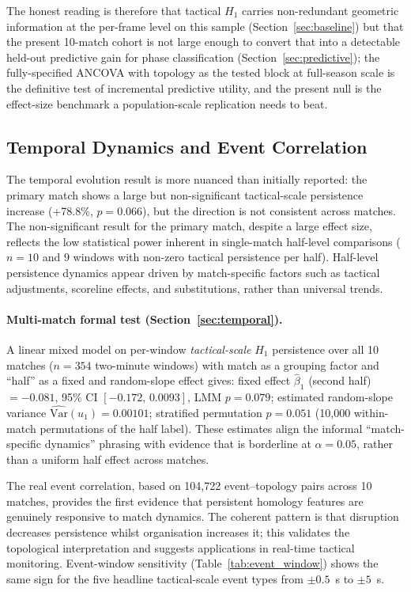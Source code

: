 The honest reading is therefore that tactical \(H_1\) carries non-redundant geometric information at the per-frame level on this sample (Section~\ref{sec:baseline}) but that the present 10-match cohort is not large enough to convert that into a detectable held-out predictive gain for phase classification (Section~\ref{sec:predictive}); the fully-specified ANCOVA with topology as the tested block at full-season scale is the definitive test of incremental predictive utility, and the present null is the effect-size benchmark a population-scale replication needs to beat.

\subsection{Temporal Dynamics and Event Correlation}

The temporal evolution result is more nuanced than initially reported: the primary match shows a large but non-significant tactical-scale persistence increase (+78.8\%, \(p=0.066\)), but the direction is not consistent across matches. The non-significant result for the primary match, despite a large effect size, reflects the low statistical power inherent in single-match half-level comparisons ($n=10$ and 9 windows with non-zero tactical persistence per half). Half-level persistence dynamics appear driven by match-specific factors such as tactical adjustments, scoreline effects, and substitutions, rather than universal trends.

\paragraph{Multi-match formal test (Section~\ref{sec:temporal}).}
A linear mixed model on per-window \emph{tactical-scale} $H_1$ persistence over all 10 matches ($n=354$ two-minute windows) with match as a grouping factor and ``half'' as a fixed and random-slope effect gives: fixed effect $\hat\beta_1$ (second half) $=-0.081$, 95\% CI $[-0.172,\,0.0093]$, LMM $p=0.079$; estimated random-slope variance $\widehat{\mathrm{Var}}(u_1)=0.00101$; stratified permutation $p=0.051$ (10{,}000 within-match permutations of the half label). These estimates align the informal ``match-specific dynamics'' phrasing with evidence that is borderline at $\alpha=0.05$, rather than a uniform half effect across matches.

The real event correlation, based on 104{,}722 event--topology pairs across 10 matches, provides the first evidence that persistent homology features are genuinely responsive to match dynamics. The coherent pattern is that disruption decreases persistence whilst organisation increases it; this validates the topological interpretation and suggests applications in real-time tactical monitoring. Event-window sensitivity (Table~\ref{tab:event_window}) shows the same sign for the five headline tactical-scale event types from $\pm0.5$~s to $\pm5$~s.

